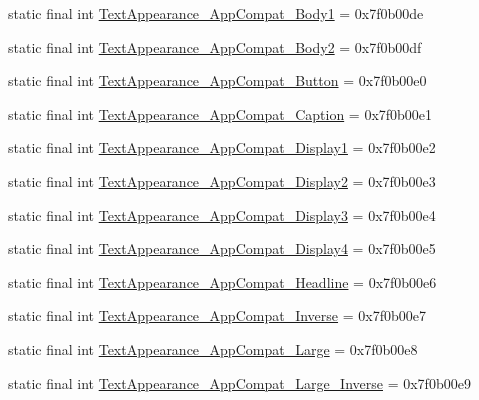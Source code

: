 \begin{CompactItemize}
\item 
static final int \hyperlink{classandroid_1_1support_1_1v7_1_1mediarouter_1_1_r_1_1style_5fa1cdc6dfd997751d85e2bbe22d2115}{TextAppearance\_\-AppCompat\_\-Body1} = 0x7f0b00de
\item 
static final int \hyperlink{classandroid_1_1support_1_1v7_1_1mediarouter_1_1_r_1_1style_ef1a488c5054bbd84f4974033225d5db}{TextAppearance\_\-AppCompat\_\-Body2} = 0x7f0b00df
\item 
static final int \hyperlink{classandroid_1_1support_1_1v7_1_1mediarouter_1_1_r_1_1style_5a191a10ade84da90afa066a503e9545}{TextAppearance\_\-AppCompat\_\-Button} = 0x7f0b00e0
\item 
static final int \hyperlink{classandroid_1_1support_1_1v7_1_1mediarouter_1_1_r_1_1style_1790d0259bbac1c01596eba497484d2d}{TextAppearance\_\-AppCompat\_\-Caption} = 0x7f0b00e1
\item 
static final int \hyperlink{classandroid_1_1support_1_1v7_1_1mediarouter_1_1_r_1_1style_0c4d829acfc724a2f0b635d8f9ec9bf9}{TextAppearance\_\-AppCompat\_\-Display1} = 0x7f0b00e2
\item 
static final int \hyperlink{classandroid_1_1support_1_1v7_1_1mediarouter_1_1_r_1_1style_0141149b82e800064e5fa66c72a211db}{TextAppearance\_\-AppCompat\_\-Display2} = 0x7f0b00e3
\item 
static final int \hyperlink{classandroid_1_1support_1_1v7_1_1mediarouter_1_1_r_1_1style_27f1d131d37037d876c1ce590ff85417}{TextAppearance\_\-AppCompat\_\-Display3} = 0x7f0b00e4
\item 
static final int \hyperlink{classandroid_1_1support_1_1v7_1_1mediarouter_1_1_r_1_1style_dcd1b9d7105b8d84dc4a1c0b860bdd4e}{TextAppearance\_\-AppCompat\_\-Display4} = 0x7f0b00e5
\item 
static final int \hyperlink{classandroid_1_1support_1_1v7_1_1mediarouter_1_1_r_1_1style_be81f5230d7cff045c1f6a03a64d90a0}{TextAppearance\_\-AppCompat\_\-Headline} = 0x7f0b00e6
\item 
static final int \hyperlink{classandroid_1_1support_1_1v7_1_1mediarouter_1_1_r_1_1style_1203b9f1e8fa4c51da2764d1c1f3ad25}{TextAppearance\_\-AppCompat\_\-Inverse} = 0x7f0b00e7
\item 
static final int \hyperlink{classandroid_1_1support_1_1v7_1_1mediarouter_1_1_r_1_1style_f8df46daa74367e6abada55e2e1bc867}{TextAppearance\_\-AppCompat\_\-Large} = 0x7f0b00e8
\item 
static final int \hyperlink{classandroid_1_1support_1_1v7_1_1mediarouter_1_1_r_1_1style_465f96223fdef41820166cdd65ad6a3e}{TextAppearance\_\-AppCompat\_\-Large\_\-Inverse} = 0x7f0b00e9

\end{CompactItemize}

